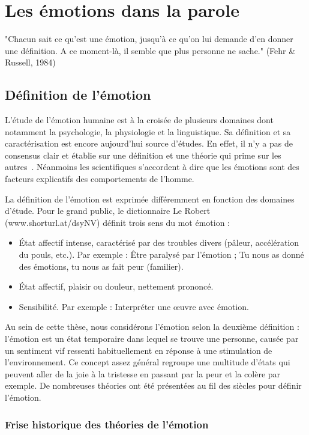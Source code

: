 \chapter{Les émotions dans la parole}
\label{chapitre1}
"Chacun sait ce qu’est une émotion, jusqu’à ce qu’on lui demande d’en donner une définition. A ce moment-là, il semble que plus personne ne sache." (Fehr \& Russell, 1984)

 \section{Définition de l'émotion}
L'étude de l'émotion humaine est à la croisée de plusieurs domaines dont notamment la psychologie, la physiologie et la linguistique. Sa définition et sa caractérisation est encore aujourd'hui source d'études. En effet, il n'y a pas de consensus clair et établie sur une définition et une théorie qui prime sur les autres~\cite{Kleinginna1981,Strongman1996}. Néanmoins les scientifiques s'accordent à dire que les émotions sont des facteurs explicatifs des comportements de l'homme.

La définition de l'émotion est exprimée différemment en fonction des domaines d'étude. Pour le grand public, le dictionnaire Le Robert (www.shorturl.at/dsyNV) définit trois sens du mot émotion :
\begin{itemize}
    \item État affectif intense, caractérisé par des troubles divers (pâleur, accélération du pouls, etc.). Par exemple : Être paralysé par l'émotion ; Tu nous as donné des émotions, tu nous as fait peur (familier).
    \item État affectif, plaisir ou douleur, nettement prononcé.
    \item Sensibilité. Par exemple : Interpréter une œuvre avec émotion.
\end{itemize}
Au sein de cette thèse, nous considérons l'émotion selon la deuxième définition : l'émotion est un état temporaire dans lequel se trouve une personne, causée par un sentiment vif ressenti habituellement en réponse à une stimulation de l'environnement. Ce concept assez général regroupe une multitude d'états qui peuvent aller de la joie à la tristesse en passant par la peur et la colère par exemple. De nombreuses théories ont été présentées au fil des siècles pour définir l'émotion.

\subsection{Frise historique des théories de l'émotion}


